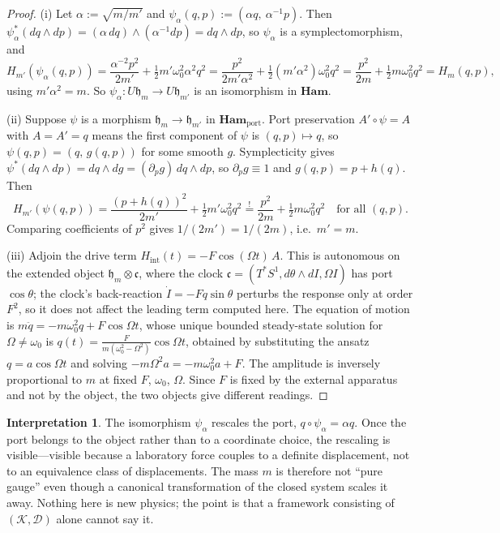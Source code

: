 \documentclass[10pt,a4paper]{article}
\theoremstyle{plain}
\theoremstyle{definition}
\newtheorem{interpretation}[theorem]{Interpretation}
\newcommand{\Ham}{\mathbf{Ham}}
\newcommand{\HamP}{\mathbf{Ham}_{\mathrm{port}}}
\begin{document}
\begin{proof}
(i) Let $\alpha := \sqrt{m/m'}$ and $\psi_\alpha(q,p) := (\alpha q,\ \alpha^{-1}p)$. Then $\psi_\alpha^*(dq\wedge dp) = (\alpha\,dq)\wedge(\alpha^{-1}dp) = dq\wedge dp$, so $\psi_\alpha$ is a symplectomorphism, and
\[
H_{m'}(\psi_\alpha(q,p)) = \frac{\alpha^{-2}p^2}{2m'} + \tfrac12 m'\omega_0^2\alpha^2q^2 = \frac{p^2}{2m'\alpha^2} + \tfrac12 (m'\alpha^2)\omega_0^2q^2 = \frac{p^2}{2m} + \tfrac12 m\omega_0^2 q^2 = H_m(q,p),
\]
using $m'\alpha^2 = m$. So $\psi_\alpha: U\mathfrak{h}_m \to U\mathfrak{h}_{m'}$ is an isomorphism in $\Ham$.

(ii) Suppose $\psi$ is a morphism $\mathfrak{h}_m \to \mathfrak{h}_{m'}$ in $\HamP$. Port preservation $A'\circ\psi = A$ with $A = A' = q$ means the first component of $\psi$ is $(q,p)\mapsto q$, so $\psi(q,p) = (q,\,g(q,p))$ for some smooth $g$. Symplecticity gives $\psi^*(dq\wedge dp) = dq\wedge dg = (\partial_pg)\,dq\wedge dp$, so $\partial_pg \equiv 1$ and $g(q,p) = p + h(q)$. Then
\[
H_{m'}(\psi(q,p)) = \frac{(p+h(q))^2}{2m'} + \tfrac12 m'\omega_0^2q^2 \stackrel{!}{=} \frac{p^2}{2m} + \tfrac12 m\omega_0^2q^2 \quad \text{for all } (q,p).
\]
Comparing coefficients of $p^2$ gives $1/(2m') = 1/(2m)$, i.e.\ $m' = m$.

(iii) Adjoin the drive term $H_{\mathrm{int}}(t) = -F\cos(\Omega t)\,A$. This is autonomous on the extended object $\mathfrak{h}_m\otimes\mathfrak{c}$, where the clock $\mathfrak{c} = (T^*S^1, d\theta\wedge dI, \Omega I)$ has port $\cos\theta$; the clock's back-reaction $\dot I = -F q\sin\theta$ perturbs the response only at order $F^2$, so it does not affect the leading term computed here. The equation of motion is $m\ddot q = -m\omega_0^2q + F\cos\Omega t$, whose unique bounded steady-state solution for $\Omega\neq\omega_0$ is $q(t) = \frac{F}{m(\omega_0^2-\Omega^2)}\cos\Omega t$, obtained by substituting the ansatz $q = a\cos\Omega t$ and solving $-m\Omega^2a = -m\omega_0^2a + F$. The amplitude is inversely proportional to $m$ at fixed $F$, $\omega_0$, $\Omega$. Since $F$ is fixed by the external apparatus and not by the object, the two objects give different readings.
\end{proof}

\begin{interpretation}
\label{int:noniso}
The isomorphism $\psi_\alpha$ rescales the port, $q\circ\psi_\alpha = \alpha q$. Once the port belongs to the object rather than to a coordinate choice, the rescaling is visible---visible because a laboratory force couples to a definite displacement, not to an equivalence class of displacements. The mass $m$ is therefore not ``pure gauge'' even though a canonical transformation of the closed system scales it away. Nothing here is new physics; the point is that a framework consisting of $(\mathcal{K},\mathcal{D})$ alone cannot say it.
\end{interpretation}
\end{document}
